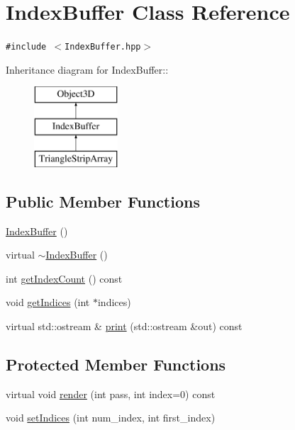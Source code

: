 \hypertarget{classm3g_1_1IndexBuffer}{
\section{IndexBuffer Class Reference}
\label{classm3g_1_1IndexBuffer}
}
{\tt \#include $<$IndexBuffer.hpp$>$}

Inheritance diagram for IndexBuffer::\begin{figure}[H]
\begin{center}
\leavevmode
\includegraphics[height=3cm]{classm3g_1_1IndexBuffer}
\end{center}
\end{figure}
\subsection*{Public Member Functions}
\begin{CompactItemize}
\item 
\hyperlink{classm3g_1_1IndexBuffer_d2e68a2d7c6c753d3abfeef42ee79427}{IndexBuffer} ()
\item 
virtual \hyperlink{classm3g_1_1IndexBuffer_ac7952364fe4d2d7b2731da5380c841c}{$\sim$IndexBuffer} ()
\item 
int \hyperlink{classm3g_1_1IndexBuffer_fe9ae2993ebcdb93d5ff26d57c81b73e}{getIndexCount} () const 
\item 
void \hyperlink{classm3g_1_1IndexBuffer_650953afac45099025a524ab160b911f}{getIndices} (int $\ast$indices)
\item 
virtual std::ostream \& \hyperlink{classm3g_1_1IndexBuffer_6fea17fa1532df3794f8cb39cb4f911f}{print} (std::ostream \&out) const 
\end{CompactItemize}
\subsection*{Protected Member Functions}
\begin{CompactItemize}
\item 
virtual void \hyperlink{classm3g_1_1IndexBuffer_1efcb1973989d9963d5bd6d03065d389}{render} (int pass, int index=0) const 
\item 
void \hyperlink{classm3g_1_1IndexBuffer_26c5b78691f0f92bd8589714cc25b6a8}{setIndices} (int num\_\-index, int first\_\-index)
\end{CompactItemize}
